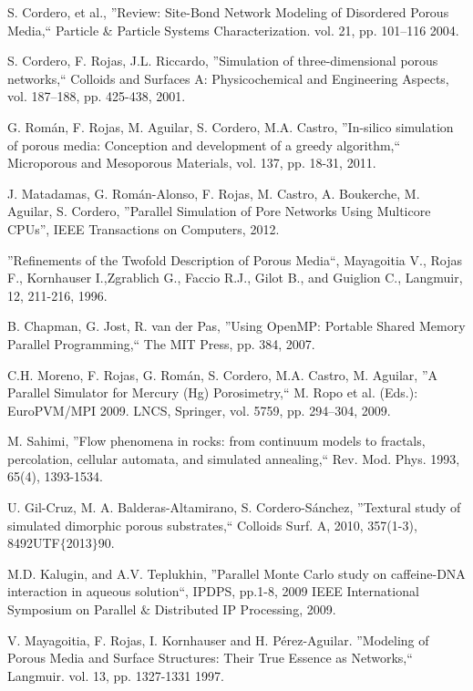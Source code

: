 
\begin{thebibliography}{9}
 \bigskip
 \barra
 \bigskip

S. Cordero, et al., ''Review: Site-Bond Network Modeling of Disordered Porous Media,``  Particle \& Particle Systems Characterization. vol. 21, pp. 101–116 2004.

S. Cordero, F. Rojas, J.L. Riccardo, ''Simulation of three-dimensional porous networks,`` Colloids and Surfaces A: Physicochemical and Engineering Aspects, vol. 187–188, pp. 425-438, 2001. 

G. Román, F. Rojas, M. Aguilar, S. Cordero, M.A. Castro, ''In-silico simulation of porous media: Conception and development of a greedy algorithm,`` Microporous and Mesoporous Materials, vol. 137, pp. 18-31, 2011. 

J. Matadamas, G. Román-Alonso, F. Rojas, M. Castro, A. Boukerche, M. Aguilar, S. Cordero, ''Parallel Simulation of Pore Networks Using Multicore CPUs”, IEEE Transactions on Computers, 2012. 

''Refinements of the Twofold Description of Porous Media``, Mayagoitia V., Rojas F., Kornhauser I.,Zgrablich G., Faccio R.J., Gilot B., and Guiglion C., Langmuir, 12, 211-216, 1996. 

B. Chapman, G. Jost, R. van der Pas, ''Using OpenMP: Portable Shared Memory Parallel Programming,`` The MIT Press, pp. 384, 2007. 

C.H. Moreno, F. Rojas, G. Román, S. Cordero, M.A. Castro, M. Aguilar, ''A Parallel Simulator for Mercury (Hg) Porosimetry,`` M. Ropo et al. (Eds.): EuroPVM/MPI 2009. LNCS, Springer, vol. 5759, pp. 294–304, 2009.

M. Sahimi, ''Flow phenomena in rocks: from continuum models to fractals, percolation, cellular automata, and simulated annealing,`` Rev. Mod. Phys. 1993, 65(4), 1393-1534. 

U. Gil-Cruz, M. A. Balderas-Altamirano, S. Cordero-Sánchez, ''Textural study of simulated dimorphic porous substrates,`` Colloids Surf. A, 2010, 357(1-3), 8492UTF$\{$2013$\}$90. 

M.D. Kalugin, and A.V. Teplukhin, ''Parallel Monte Carlo study on caffeine-DNA interaction in aqueous solution``, IPDPS, pp.1-8, 2009 IEEE International Symposium on Parallel $\&$ Distributed IP Processing, 2009. 

V. Mayagoitia, F. Rojas, I. Kornhauser and H. Pérez-Aguilar. ''Modeling of Porous Media and Surface Structures: Their True Essence as Networks,`` Langmuir. vol. 13, pp. 1327-1331 1997.


\end{thebibliography}
